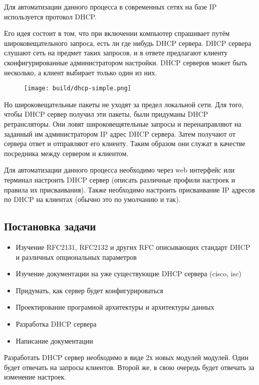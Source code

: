 \documentclass[12pt]{article}
\begin{document}
Для автоматизации данного процесса в современных сетях на базе IP используется протокол DHCP.

Его идея состоит в том, что при включении компьютер спрашивает путём широковещательного запроса, есть ли где нибудь DHCP сервера.
DHCP сервера слушают сеть на предмет таких запросов, и в ответе предлагают клиенту сконфигурированные администратором настройки.
DHCP серверов может быть несколько, а клиент выбирает только один из них.

\begin{figure}[H]
    \texttt{[image: build/dhcp-simple.png]}
    \caption{}
\end{figure}

Но широковещательные пакеты не уходят за предел локальной сети.
Для того, чтобы DHCP сервер получил эти пакеты, были придуманы DHCP ретрансляторы.
Они ловят широковещятельные запросы и перенаправляют на заданный им администратором IP адрес DHCP сервера.
Затем получают от сервера ответ и отправляют его клиенту.
Таким образом они служат в качестве посредника между сервером и клиентом.

Для автоматизации данного процесса необходимо через web интерфейс или терминал настроить DHCP сервер (описать различные профили настроек и правила их присваивания). Также необходимо настроить присваивание IP адресов по DHCP на клиентах (обычно это по умолчанию и так).

\subsection{Постановка задачи}

\begin{itemize}
    \item Изучение RFC2131, RFC2132 и других RFC описывающих стандарт DHCP и различных опциональных параметров
    \item Изучение документации на уже существующие DHCP сервера (cisco, isc)
    \item Придумать, как сервер будет конфигурироваться
    \item Проектирование програмной архитектуры и архитектуры данных
    \item Разработка DHCP сервера
    \item Написание документации
\end{itemize}

Разработать DHCP сервер необходимо в виде 2х новых модулей модулей.
Один будет отвечать на запросы клиентов.
Второй же, в свою очередь будет отвечать за изменение настроек.
\end{document}

